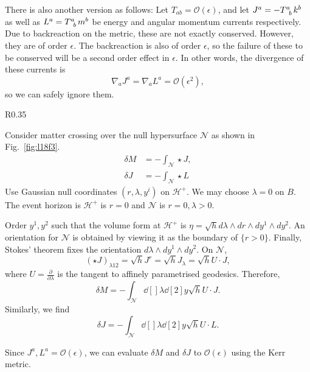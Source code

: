There is also another version as follows:
Let $T_{ab} = \mathcal{O}(\epsilon)$, and let $J^{a} = -T\indices{^{a}_{b}} k^{b}$ as well as $L^{a} = T\indices{^{a}_{b}} m^{b}$ be energy and angular momentum currents respectively.
Due to backreaction on the metric, these are not exactly conserved. However, they are of order $\epsilon$.
The backreaction is also of order $\epsilon$, so the failure of these to be conserved will be a second order effect in $\epsilon$.
In other words, the divergence of these currents is
\begin{equation}
  \nabla_a J^{a} = \nabla_a L^{a} = \mathcal{O}(\epsilon^2),
\end{equation}
so we can safely ignore them.
\begin{wrapfigure}{R}{0.35\textwidth}
    \centering
    \caption{}
    \label{fig:l18f3}
\end{wrapfigure}
Consider matter crossing over the null hypersurface $\mathcal{N}$ as shown in Fig.~\ref{fig:l18f3}.
\begin{align}
  \delta M &= - \int_\mathcal{N} \star J, \\
  \delta J &= - \int_\mathcal{N} \star L
\end{align}
Use Gaussian null coordinates $(r, \lambda, y^{i})$ on $\mathcal{H}^+$. We may choose $\lambda = 0$ on $B$.
The event horizon is $\mathcal{H}^+$ is $r = 0$ and $\mathcal{N}$ is $r = 0, \lambda > 0$.

Order $y^1, y^2$ such that the volume form at $\mathcal{H}^+$ is $\eta = \sqrt{h} d \lambda \wedge d r \wedge dy^1 \wedge dy^2$.
An orientation for $\mathcal{N}$ is obtained by viewing it as the boundary of $\{r > 0\}$.
Finally, Stokes' theorem fixes the orientation $ d \lambda \wedge dy^1 \wedge dy^2.$
On  $\mathcal{N}$,
\begin{equation}
  (\star J)_{\lambda 1 2} = \sqrt{h} J^{r} = \sqrt{h} J_\lambda = \sqrt{h} U \cdot J,
\end{equation}
where $U = \frac{\partial }{\partial \lambda}$ is the tangent to affinely parametrised geodesics.
Therefore, 
\begin{equation}
  \delta M = - \int_\mathcal{N}	\dd[]{\lambda} \dd[2]{y} \sqrt{h} U \cdot J.
\end{equation}
Similarly, we find
\begin{equation}
  \delta J = - \int_\mathcal{N} \dd[]{\lambda} \dd[2]{y} \sqrt{h} U \cdot L.
\end{equation}

Since $J^{a}, L^{a} = \mathcal{O}(\epsilon)$, we can evaluate $\delta M$ and $\delta J$ to $\mathcal{O}(\epsilon)$ using the Kerr metric.

